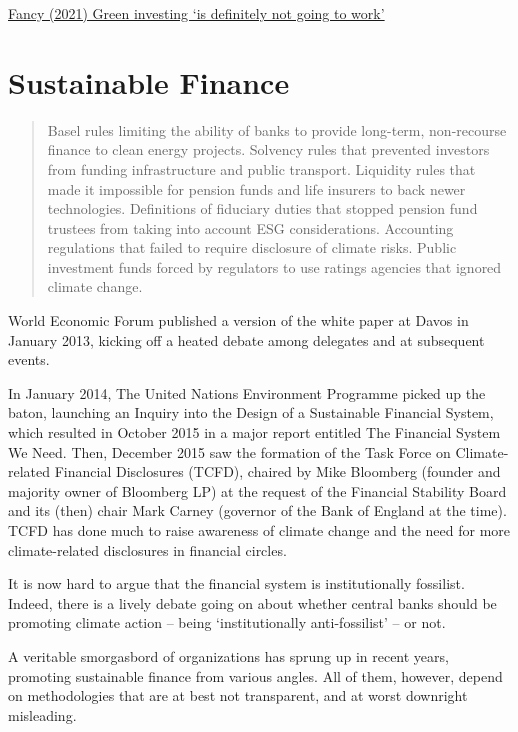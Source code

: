 \documentclass[
]{book}
\begin{document}
\href{https://www.theguardian.com/business/2021/mar/30/tariq-fancy-environmentally-friendly-green-investing}{Fancy (2021) Green investing `is definitely not going to work'}

\hypertarget{sustainable-finance}{%
\section{Sustainable Finance}\label{sustainable-finance}}

\begin{quote}
Basel rules limiting the ability of banks to provide long-term, non-recourse finance to clean energy projects. Solvency rules that prevented investors from funding infrastructure and public transport. Liquidity rules that made it impossible for pension funds and life insurers to back newer technologies. Definitions of fiduciary duties that stopped pension fund trustees from taking into account ESG considerations. Accounting regulations that failed to require disclosure of climate risks. Public investment funds forced by regulators to use ratings agencies that ignored climate change.
\end{quote}

World Economic Forum published a version of the white paper at Davos in January 2013, kicking off a heated debate among delegates and at subsequent events.

In January 2014, The United Nations Environment Programme picked up the baton, launching an Inquiry into the Design of a Sustainable Financial System, which resulted in October 2015 in a major report entitled The Financial System We Need. Then, December 2015 saw the formation of the Task Force on Climate-related Financial Disclosures (TCFD), chaired by Mike Bloomberg (founder and majority owner of Bloomberg LP) at the request of the Financial Stability Board and its (then) chair Mark Carney (governor of the Bank of England at the time). TCFD has done much to raise awareness of climate change and the need for more climate-related disclosures in financial circles.

It is now hard to argue that the financial system is institutionally fossilist. Indeed, there is a lively debate going on about whether central banks should be promoting climate action -- being `institutionally anti-fossilist' -- or not.

A veritable smorgasbord of organizations has sprung up in recent years, promoting sustainable finance from various angles. All of them, however, depend on methodologies that are at best not transparent, and at worst downright misleading.
\end{document}
